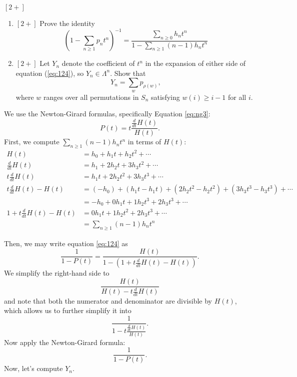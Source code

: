\documentclass{article}
\begin{document}
\begin{exercise}
    $[2+]$
    \begin{enumerate}[label=(\alph*)]
        \item $[2+]$ Prove the identity
            \begin{equation}\label{eq:124}
                \left(1-\sum_{n\geq1}p_nt^n\right)^{-1} = \frac{\sum_{n\geq0}h_nt^n}{1-\sum_{n\geq1}(n-1)h_nt^n}
            \end{equation}
        \item $[2+]$ Let $Y_n$ denote the coefficient of $t^n$ in the expansion of either side of equation (\ref{eq:124}), so $Y_n \in \Lambda^n$. Show that
            \[
                Y_n = \sum_w p_{\rho(w)},
            \]
            where $w$ ranges over all permutations in $S_n$ satisfying $w(i) \geq i-1$ for all $i$.
    \end{enumerate}
\end{exercise}

We use the Newton-Girard formulas, specifically Equation \ref{eq:ng3}:
\[
    P(t) = t\frac{\frac{d}{dt}H(t)}{H(t)}.
\]
First, we compute $\sum_{n\geq1}(n-1)h_nt^n$ in terms of $H(t)$:
\begin{align*}
    H(t) &= h_0 + h_1t + h_2t^2 + \cdots \\
    \frac{d}{dt}H(t) &= h_1 + 2h_2t + 3h_3t^2 + \cdots \\
    t\frac{d}{dt}H(t) &= h_1t + 2h_2t^2 + 3h_3t^3 + \cdots \\
    t\frac{d}{dt}H(t) - H(t) &= (-h_0) + (h_1t-h_1t) + (2h_2t^2 - h_2t^2) + (3h_3t^3 - h_3t^3) + \cdots \\
    &= -h_0 + 0h_1t + 1h_2t^3 + 2h_3t^3 + \cdots \\
    1 + t\frac{d}{dt}H(t) - H(t) &= 0h_1t + 1h_2t^2 + 2h_3t^3 + \cdots \\
                                &= \sum_{n\geq 1} (n-1) h_nt^n
\end{align*}

Then, we may write equation \ref{eq:124} as
\[
    \frac{1}{1-P(t)} = \frac{H(t)}{1 - (1 + t\frac{d}{dt}H(t) - H(t))}.
\]
We simplify the right-hand side to
\[
    \frac{H(t)}{H(t) - t\frac{d}{dt}H(t)}
\]
and note that both the numerator and denominator are divisible by $H(t)$, which allows us to further simplify it into
\[
    \frac{1}{1 - t\frac{\frac{d}{dt}H(t)}{H(t)}}.
\]
Now apply the Newton-Girard formula:
\[
    \frac{1}{1 - P(t)}.
\]
Now, let's compute $Y_n$.
\end{document}
